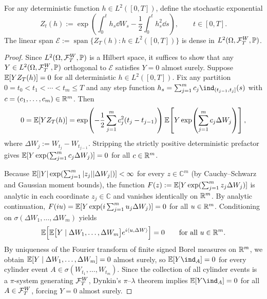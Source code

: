 \begin{lemma}\label{lem:stoch-exp-dense}
    For any deterministic function $h \in L^2([0, T])$, define the stochastic exponential
    \[
    Z_t(h) := \exp\!\left(\int_0^t h_s\dd W_s - \frac{1}{2}\int_0^t h_s^2\dd s\right), \qquad t \in [0, T].
    \]
    The linear span $\mathcal{E} := \operatorname{span}\{Z_T(h) : h \in L^2([0, T])\}$ is dense in $L^2(\Omega, \mathcal{F}_T^W, \mathbb{P})$.
\end{lemma}
\begin{proof}
    Since $L^2(\Omega, \mathcal{F}_T^W, \mathbb{P})$ is a Hilbert space, it suffices to show that any $Y \in L^2(\Omega, \mathcal{F}_T^W, \mathbb{P})$ orthogonal to $\mathcal{E}$ satisfies $Y = 0$ almost surely. Suppose $\mathbb{E}[Y Z_T(h)] = 0$ for all deterministic $h \in L^2([0, T])$. Fix any partition $0 = t_0 < t_1 < \cdots < t_m \leq T$ and any step function $h_s = \sum_{j=1}^m c_j \ind_{(t_{j-1}, t_j]}(s)$ with $c = (c_1, \ldots, c_m) \in \mathbb{R}^m$. Then
    \[
    0 = \mathbb{E}[Y Z_T(h)] = \exp\!\left(-\frac{1}{2}\sum_{j=1}^m c_j^2 (t_j - t_{j-1})\right)
    \mathbb{E}\!\left[Y \exp\!\left(\sum_{j=1}^m c_j \Delta W_j\right)\right],
    \]
    where $\Delta W_j := W_{t_j} - W_{t_{j-1}}$. Stripping the strictly positive deterministic prefactor gives $\mathbb{E}[Y \exp(\sum_{j=1}^m c_j \Delta W_j)] = 0$ for all $c \in \mathbb{R}^m$.

    Because $\mathbb{E}[|Y|\exp(\sum_{j=1}^m |z_j| |\Delta W_j|)] < \infty$ for every $z \in \mathbb{C}^m$ (by Cauchy--Schwarz and Gaussian moment bounds), the function $F(z) := \mathbb{E}[Y \exp(\sum_{j=1}^m z_j \Delta W_j)]$ is analytic in each coordinate $z_j \in \mathbb{C}$ and vanishes identically on $\mathbb{R}^m$. By analytic continuation, $F(i u) = \mathbb{E}[Y \exp(i \sum_{j=1}^m u_j \Delta W_j)] = 0$ for all $u \in \mathbb{R}^m$. Conditioning on $\sigma(\Delta W_1, \ldots, \Delta W_m)$ yields
    \[
    \mathbb{E}\!\left[\mathbb{E}\bigl[Y \mid \Delta W_1, \ldots, \Delta W_m\bigr] e^{i \langle u, \Delta W \rangle}\right] = 0 \qquad \text{for all } u \in \mathbb{R}^m.
    \]
    By uniqueness of the Fourier transform of finite signed Borel measures on $\mathbb{R}^m$, we obtain $\mathbb{E}[Y \mid \Delta W_1, \ldots, \Delta W_m] = 0$ almost surely, so $\E[Y \ind_A] = 0$ for every cylinder event $A \in \sigma(W_{t_1}, \ldots, W_{t_m})$. Since the collection of all cylinder events is a $\pi$-system generating $\mathcal{F}_T^W$, Dynkin's $\pi$--$\lambda$ theorem implies $\E[Y \ind_A] = 0$ for all $A \in \mathcal{F}_T^W$, forcing $Y = 0$ almost surely.
\end{proof}

